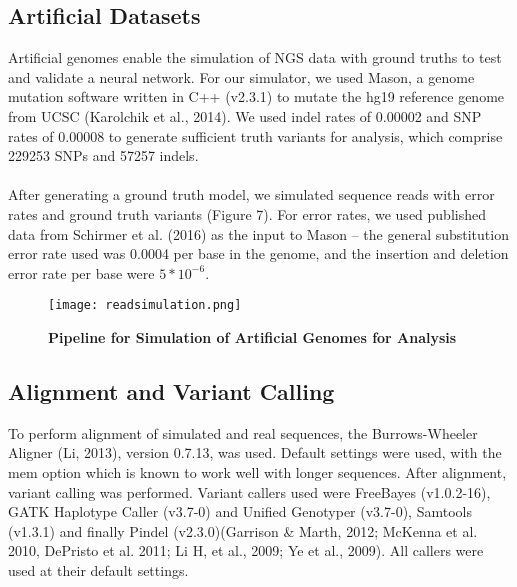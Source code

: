 \documentclass{article}
\begin{document}
\subsection{Artificial Datasets}
Artificial genomes enable the simulation of NGS data with ground truths to test and validate a neural network. For our simulator, we used Mason, a genome mutation software written in C++ (v2.3.1) to mutate the hg19 reference genome from UCSC (Karolchik et al., 2014). We used indel rates of 0.00002 and SNP rates of 0.00008 to generate sufficient truth variants for analysis, which comprise 229253 SNPs and 57257 indels.\\\\
After generating a ground truth model, we simulated sequence reads with error rates and ground truth variants (Figure 7). For error rates, we used published data from Schirmer et al. (2016) as the input to Mason -- the general substitution error rate used was 0.0004 per base in the genome, and the insertion and deletion error rate per base were $5*10^{-6}$.

\begin{figure}[H]
\texttt{[image: readsimulation.png]}
\caption{\textbf{Pipeline for Simulation of Artificial Genomes for Analysis}}
\centering
\end{figure}

\subsection{Alignment and Variant Calling} 
To perform alignment of simulated and real sequences, the Burrows-Wheeler Aligner (Li, 2013), version 0.7.13, was used. Default settings were used, with the mem option which is known to work well with longer sequences. After alignment, variant calling was performed. Variant callers used were FreeBayes (v1.0.2-16), GATK Haplotype Caller (v3.7-0) and Unified Genotyper (v3.7-0), Samtools (v1.3.1) and finally Pindel (v2.3.0)(Garrison \& Marth, 2012; McKenna et al. 2010, DePristo et al. 2011; Li H, et al., 2009; Ye et al., 2009). All callers were used at their default settings.
\end{document}
